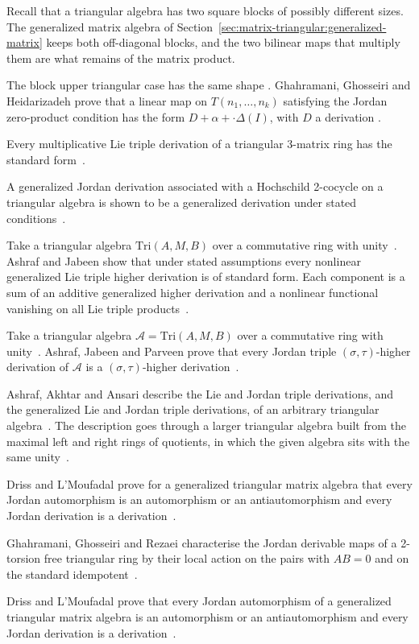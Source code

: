 Recall that a triangular algebra has two square blocks of possibly different
sizes. The generalized matrix algebra of
Section~\ref{sec:matrix-triangular:generalized-matrix} keeps both off-diagonal
blocks, and the two bilinear maps that multiply them are what remains of the
matrix product.

The block upper triangular case has the same shape
\cite[Abstract]{GhahramaniGhosseiriHeidarizadeh2020}. Ghahramani, Ghosseiri
and Heidarizadeh prove that a linear map on $T(n_1,\dots,n_k)$ satisfying the
Jordan zero-product condition has the form $D+\alpha+\cdot\Delta(I)$, with $D$
a derivation \cite[Abstract]{GhahramaniGhosseiriHeidarizadeh2020}.

Every multiplicative Lie triple derivation of a triangular 3-matrix ring has
the standard form~\cite{WlMultiplicativeLieTriple2021}.

A generalized Jordan derivation associated with a Hochschild 2-cocycle on a
triangular algebra is shown to be a generalized derivation under stated
conditions~\cite{WlGeneralizedJordanDerivationsAs2019}.

Take a triangular algebra $\mathrm{Tri}(A,M,B)$ over a commutative ring with
unity~\cite{WlNonlinearLieTripleHigherDeriva2018}. Ashraf and Jabeen show that under stated assumptions every nonlinear
generalized Lie triple higher derivation is of standard form. Each component %
is a sum of an additive generalized higher derivation and a nonlinear
functional vanishing on all Lie triple
products~\cite{WlNonlinearLieTripleHigherDeriva2018}.

Take a triangular algebra $\mathcal{A}=\mathrm{Tri}(A,M,B)$ over a commutative
ring with unity~\cite{WlOnJordanTripleHigherDerivation2018}. Ashraf, Jabeen and Parveen prove that every Jordan triple
$(\sigma,\tau)$-higher derivation of $\mathcal{A}$ is a $(\sigma,\tau)$-higher
derivation~\cite{WlOnJordanTripleHigherDerivation2018}.

Ashraf, Akhtar and Ansari describe the Lie and Jordan triple derivations, and
the generalized Lie and Jordan triple derivations, of an arbitrary triangular
algebra~\cite{WlGeneralizedLieJordanTripleDeri2021}. The description goes through a larger triangular algebra built from
the maximal left and
right rings of quotients, in which the given algebra sits with the same
unity~\cite{WlGeneralizedLieJordanTripleDeri2021}.

Driss and L'Moufadal prove for a generalized triangular matrix algebra that
every Jordan automorphism is an automorphism or an antiautomorphism and every
Jordan derivation is a derivation~\cite{WlJordanAutomorphismsJordanDeriv2005}.

Ghahramani, Ghosseiri and Rezaei characterise the Jordan derivable maps of a
2-torsion free triangular ring by their local action on the pairs with $AB=0$
and on the standard idempotent~\cite{WlCharacterizingJordanDerivableM2022}.

Driss and L'Moufadal prove that every Jordan automorphism of a generalized
triangular matrix algebra is an automorphism or an antiautomorphism and every
Jordan derivation is a derivation~\cite{WlJordanAutomorphismsJordanDeriv2020}.

